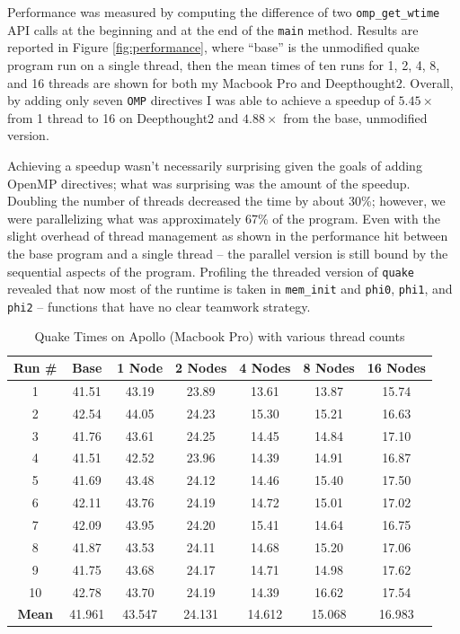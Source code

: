 \documentclass[11pt,letterpaper]{article}
\begin{document}
Performance was measured by computing the difference of two \texttt{omp\_get\_wtime} API calls at the beginning and at the end of the \texttt{main} method. Results are reported in Figure \ref{fig:performance}, where ``base'' is the unmodified quake program run on a single thread, then the mean times of ten runs for 1, 2, 4, 8, and 16 threads are shown for both my Macbook Pro and Deepthought2. Overall, by adding only seven \texttt{OMP} directives I was able to achieve a speedup of $5.45\times$ from 1 thread to 16 on Deepthought2 and $4.88\times$ from the base, unmodified version.

Achieving a speedup wasn't necessarily surprising given the goals of adding OpenMP directives; what was surprising was the amount of the speedup. Doubling the number of threads decreased the time by about 30\%; however, we were parallelizing what was approximately 67\% of the program. Even with the slight overhead of thread management as shown in the performance hit between the base program and a single thread -- the parallel version is still bound by the sequential aspects of the program. Profiling the threaded version of \texttt{quake} revealed that now most of the runtime is taken in \texttt{mem\_init} and \texttt{phi0}, \texttt{phi1}, and \texttt{phi2} -- functions that have no clear teamwork strategy.




\newpage
\appendix

\begin{table}[h!]
    \renewcommand{\arraystretch}{1.5}
    \centering
\begin{tabular}{ | c || c | c | c | c | c | c | }
	\hline
	\textbf{Run #} & \textbf{Base} & \textbf{1 Node} & \textbf{2 Nodes} & \textbf{4 Nodes} &	 \textbf{8 Nodes} & \textbf{16 Nodes} \\
	\hline
	1 & 41.51 & 43.19 & 23.89 & 13.61 & 13.87 & 15.74 \\
	2 & 42.54 & 44.05 & 24.23 & 15.30 & 15.21 & 16.63 \\
	3 & 41.76 & 43.61 & 24.25 & 14.45 & 14.84 & 17.10 \\
	4 & 41.51 & 42.52 & 23.96 & 14.39 & 14.91 & 16.87 \\
	5 & 41.69 & 43.48 & 24.12 & 14.46 & 15.40 & 17.50 \\
	6 & 42.11 & 43.76 & 24.19 & 14.72 & 15.01 & 17.02 \\
	7 & 42.09 & 43.95 & 24.20 & 15.41 & 14.64 & 16.75 \\
	8 & 41.87 & 43.53 & 24.11 & 14.68 & 15.20 & 17.06 \\
	9 & 41.75 & 43.68 & 24.17 & 14.71 & 14.98 & 17.62 \\
	10 & 42.78 & 43.70 & 24.19 & 14.39 & 16.62 & 17.54 \\
	\hline
	\textbf{Mean} & 41.961 & 43.547 & 24.131 & 14.612 & 15.068 & 16.983 \\
	\hline
\end{tabular}
	\caption{Quake Times on Apollo (Macbook Pro) with various thread counts}
	\label{table:apollo-performance}
\end{table}
\end{document}
